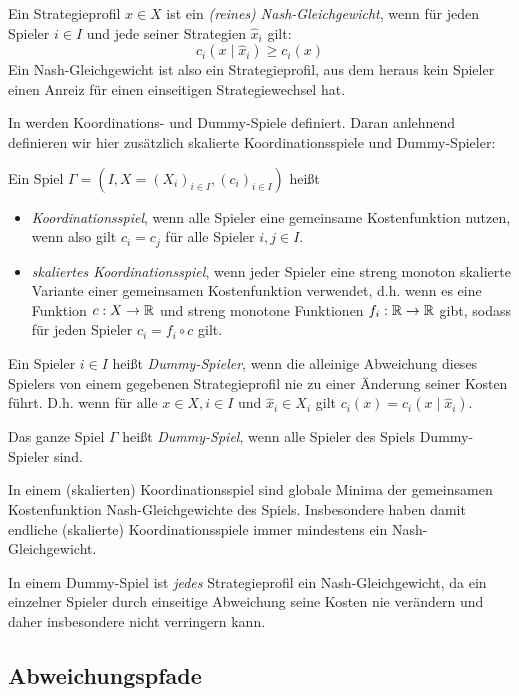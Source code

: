 \begin{defn}
	Ein Strategieprofil $x \in X$ ist ein \emph{(reines) Nash-Gleichgewicht}, wenn für jeden Spieler $i \in I$ und jede seiner Strategien $\hat{x}_i$ gilt:
		\[c_i(x \mid \hat{x}_i) \geq c_i(x)\]
	Ein Nash-Gleichgewicht ist also ein Strategieprofil, aus dem heraus kein Spieler einen Anreiz für einen einseitigen Strategiewechsel hat.	
\end{defn}

In \cite[Definition 2.2]{KoordDummy} werden Koordinations- und Dummy-Spiele definiert. Daran anlehnend definieren wir hier zusätzlich skalierte Koordinationsspiele und Dummy-Spieler:
\begin{defn}
	Ein Spiel $\Gamma = (I, X = (X_i)_{i \in I}, (c_i)_{i\in I})$ heißt
	\begin{itemize}
		\item \emph{Koordinationsspiel}, wenn alle Spieler eine gemeinsame Kostenfunktion nutzen, wenn also gilt $c_i = c_j$ für alle Spieler $i,j \in I$.
		\item \emph{skaliertes Koordinationsspiel}, wenn jeder Spieler eine streng monoton skalierte Variante einer gemeinsamen Kostenfunktion verwendet, d.h. wenn es eine Funktion $c: X \to \mathbb{R}$ und streng monotone Funktionen $f_i: \mathbb{R} \to \mathbb{R}$ gibt, sodass für jeden Spieler $c_i = f_i \circ c$ gilt.
	\end{itemize}
	Ein Spieler $i \in I$ heißt \emph{Dummy-Spieler}, wenn die alleinige Abweichung dieses Spielers von einem gegebenen Strategieprofil nie zu einer Änderung seiner Kosten führt. D.h. wenn für alle $x \in X, i \in I$ und $\hat{x}_i \in X_i$ gilt $c_i(x) = c_i(x \mid \hat{x}_i)$. 
	
	Das ganze Spiel $\Gamma$ heißt \emph{Dummy-Spiel}, wenn alle Spieler des Spiels Dummy-Spieler sind.
\end{defn}

\begin{beob}
	In einem (skalierten) Koordinationsspiel sind globale Minima der gemeinsamen Kostenfunktion Nash-Gleichgewichte des Spiels. Insbesondere haben damit endliche (skalierte) Koordinationsspiele immer mindestens ein Nash-Gleichgewicht.
	
	In einem Dummy-Spiel ist \emph{jedes} Strategieprofil ein Nash-Gleichgewicht, da ein einzelner Spieler durch einseitige Abweichung seine Kosten nie verändern und daher insbesondere nicht verringern kann.
\end{beob}


\subsection{Abweichungspfade}


